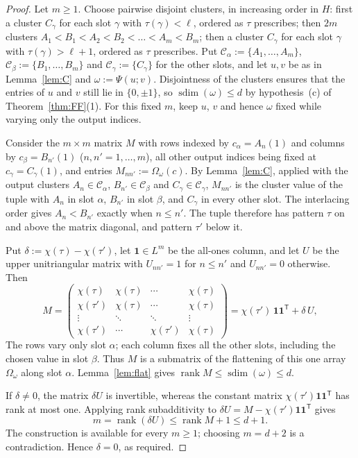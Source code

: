 \documentclass[11pt]{amsart}
\theoremstyle{definition}
\theoremstyle{remark}
\numberwithin{equation}{section}
\newcommand{\cC}{\mathcal{C}}
\newcommand{\rank}{\operatorname{rank}}
\newcommand{\sdim}{\operatorname{sdim}}
\begin{document}
\begin{proof}
Let $m\ge1$. Choose pairwise disjoint clusters, in increasing order in $H$: first a cluster $C_\gamma$ for each slot
$\gamma$ with $\tau(\gamma)<\ell$, ordered as $\tau$ prescribes; then $2m$ clusters $A_1<B_1<A_2<B_2<\dots<A_m<B_m$; then a
cluster $C_\gamma$ for each slot $\gamma$ with $\tau(\gamma)>\ell+1$, ordered as $\tau$ prescribes. Put
$\cC_\alpha:=\{A_1,\dots,A_m\}$, $\cC_\beta:=\{B_1,\dots,B_m\}$ and $\cC_\gamma:=\{C_\gamma\}$ for the other slots, and let
$u,v$ be as in Lemma~\ref{lem:C} and $\omega:=\Psi(u;v)$. Disjointness of the clusters ensures that the entries of
$u$ and $v$ still lie in $\{0,\pm1\}$, so $\sdim(\omega)\le d$ by hypothesis~(c) of Theorem~\ref{thm:FF}(1).
For this fixed $m$, keep $u$, $v$ and hence $\omega$ fixed while varying only the output indices.

Consider the $m\times m$ matrix $M$ with rows indexed by $c_\alpha=A_n(1)$ and columns by $c_\beta=B_{n'}(1)$
($n,n'=1,\dots,m$), all other output indices being fixed at $c_\gamma=C_\gamma(1)$, and entries $M_{nn'}:=\Omega_\omega(c)$.
By Lemma~\ref{lem:C}, applied with the output clusters $A_n\in\cC_\alpha$, $B_{n'}\in\cC_\beta$ and $C_\gamma\in\cC_\gamma$,
$M_{nn'}$ is the cluster value of the tuple with $A_n$ in slot $\alpha$, $B_{n'}$ in slot $\beta$, and $C_\gamma$ in
every other slot. The interlacing order gives $A_n<B_{n'}$ exactly when $n\le n'$. The tuple therefore has pattern
$\tau$ on and above the matrix diagonal, and pattern $\tau'$ below it.

Put $\delta:=\chi(\tau)-\chi(\tau')$, let $\mathbf 1\in L^m$ be the all-ones column, and let $U$ be the upper
unitriangular matrix with $U_{nn'}=1$ for $n\le n'$ and $U_{nn'}=0$ otherwise. Then
\[
M=\begin{pmatrix}
\chi(\tau)&\chi(\tau)&\cdots&\chi(\tau)\\
\chi(\tau')&\chi(\tau)&\cdots&\chi(\tau)\\
\vdots&\ddots&\ddots&\vdots\\
\chi(\tau')&\cdots&\chi(\tau')&\chi(\tau)
\end{pmatrix}
=\chi(\tau')\,\mathbf 1\mathbf 1^{\mathsf T}+\delta\,U,
\]
The rows vary only slot $\alpha$; each column fixes all the other slots, including the chosen value in slot $\beta$.
Thus $M$ is a submatrix of the flattening of this one array $\Omega_\omega$ along slot $\alpha$. Lemma~\ref{lem:flat}
gives $\rank M\le\sdim(\omega)\le d$.

If $\delta\ne0$, the matrix $\delta U$ is invertible, whereas the constant matrix
$\chi(\tau')\mathbf 1\mathbf 1^{\mathsf T}$ has rank at most one. Applying rank subadditivity to
$\delta U=M-\chi(\tau')\mathbf 1\mathbf 1^{\mathsf T}$ gives
\[
m=\rank(\delta U)\le\rank M+1\le d+1.
\]
The construction is available for every $m\ge1$; choosing $m=d+2$ is a contradiction. Hence $\delta=0$, as required.
\end{proof}
\end{document}
